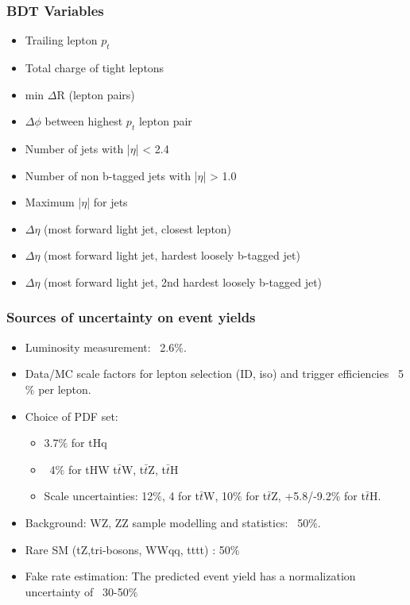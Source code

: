 \documentclass[11pt]{beamer}
\begin{document}
\begin{frame}
\frametitle{BDT Variables}
\begin{itemize}
\item	Trailing lepton $p_{t}$
\item 	Total charge of tight leptons
\item 	min $\Delta$R (lepton pairs)
\item 	$\Delta\phi$ between highest $p_t$ lepton pair
\item 	Number of jets with |$\eta$| < 2.4
\item	Number of non b-tagged jets with |$\eta$| > 1.0
\item	Maximum |$\eta$| for jets
\item	$\Delta\eta$ (most forward light jet, closest lepton)
\item	$\Delta\eta$ (most forward light jet, hardest loosely b-tagged jet)
\item	$\Delta\eta$ (most forward light jet, 2nd hardest loosely b-tagged jet)
\end{itemize}
\end{frame}

\begin{frame}
\frametitle{Sources of uncertainty on event yields}
\begin{itemize}
\item Luminosity measurement: ~2.6$\%$.
\item Data/MC scale factors for lepton selection (ID, iso) and trigger efficiencies ~5$\%$ per lepton.
\item Choice of PDF set:
\begin{itemize}
 \item 3.7$\%$ for tHq
 \item ~4$\%$ for tHW t$\bar{t}$W, t$\bar{t}$Z, t$\bar{t}$H 
 \item Scale uncertainties: 12$\%$, 4 for t$\bar{t}$W, 10$\%$ for t$\bar{t}$Z, +5.8/-9.2$\%$ for t$\bar{t}$H.
\end{itemize}
 \item Background: WZ, ZZ sample modelling and statistics: ~50$\%$.
 \item Rare SM (tZ,tri-bosons, WWqq, tttt) : 50$\%$
 \item Fake rate estimation:
 The predicted event yield has a normalization uncertainty of ~30-50$\%$ \cite{7}
\end{itemize}

\end{frame}
\end{document}
